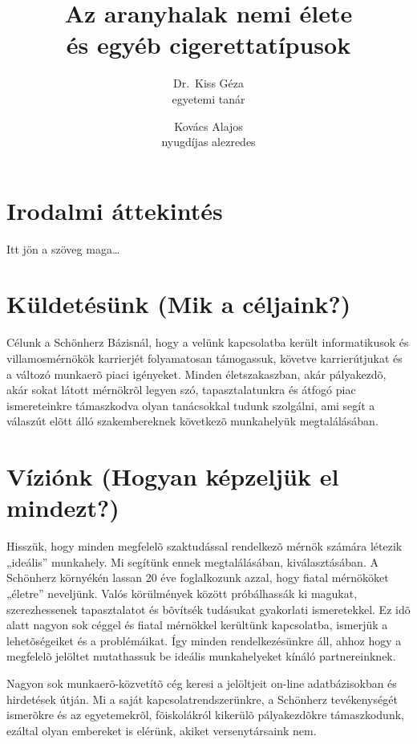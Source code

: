 \documentclass[a4paper]{article}
\begin{document}
\title{Az aranyhalak nemi élete \\
és egyéb cigerettatípusok}
\author{Dr.~Kiss Géza \\ egyetemi tanár \and
Kovács Alajos \\ nyugdíjas alezredes}
\date{}


\maketitle


\section{Irodalmi áttekintés}
Itt jön a szöveg maga\dots

\section{Küldetésünk (Mik a céljaink?)}
Célunk a Schönherz Bázisnál, hogy a velünk kapcsolatba került informatikusok és villamosmérnökök karrierjét folyamatosan támogassuk, követve karrierútjukat és a változó munkaerõ piaci igényeket. Minden életszakaszban, akár pályakezdõ, akár sokat látott mérnökrõl legyen szó, tapasztalatunkra és átfogó piac ismereteinkre támaszkodva olyan tanácsokkal tudunk szolgálni, ami segít a válaszút elõtt álló szakembereknek következõ munkahelyük megtalálásában.
\section{Víziónk (Hogyan képzeljük el mindezt?)}
Hisszük, hogy minden megfelelõ szaktudással rendelkezõ mérnök számára létezik „ideális” munkahely. Mi segítünk ennek megtalálásában, kiválasztásában. A Schönherz környékén lassan 20 éve foglalkozunk azzal, hogy fiatal mérnököket „életre” neveljünk. Valós körülmények között próbálhassák ki magukat, sze\-rezhessenek tapasztalatot és bõvítsék tudásukat gyakorlati ismeretekkel. Ez idõ alatt nagyon sok céggel és fiatal mérnökkel kerültünk kapcsolatba, ismerjük a lehetõségeiket és a problémáikat. Így minden rendelkezésünkre áll, ahhoz hogy a megfelelõ jelöltet mutathassuk be ideális munkahelyeket kínáló partnereinknek.

Nagyon sok munkaerõ-közvetítõ cég keresi a jelöltjeit on-line adatbázisokban és hirdetések útján. Mi a saját kapcsolatrendszerünkre, a Schönherz tevékenységét ismerõkre és az egyetemekrõl, fõiskolákról kikerülõ pályakezdõkre támaszkodunk, ezáltal olyan embereket is elérünk, akiket versenytársaink nem.
\end{document}
